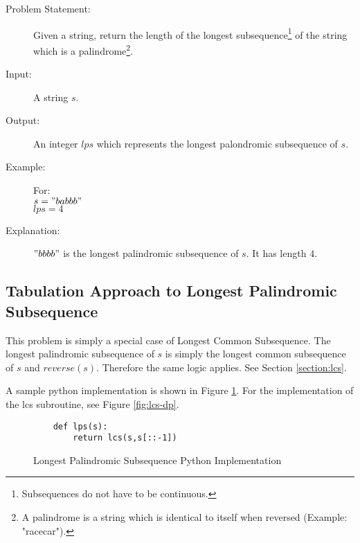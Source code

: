 \begin{description}
    \item[Problem Statement:]
        Given a string, return the length of the longest subsequence\footnote{Subsequences do not have to be continuous.} of the string which is a palindrome\footnote{A palindrome is a string which is identical to itself when reversed (Example: "racecar").}.
    
    \item[Input:]
        A string $s$.
        
    \item[Output:]
        An integer $lps$ which represents the longest palondromic subsequence of $s$.
        
    \item[Example:] For:\\
        $s = "babbb"$\\
        $lps = 4$
        
    \item[Explanation:]
        $"bbbb"$ is the longest palindromic subsequence of $s$. It has length $4$.
\end{description}

\subsection{Tabulation Approach to Longest Palindromic Subsequence}
This problem is simply a special case of Longest Common Subsequence.
The longest palindromic subsequence of $s$ is simply the longest common subsequence of $s$ and $reverse(s)$.
Therefore the same logic applies. See Section \ref{section:lcs}.

A sample python implementation is shown in Figure \ref{fig:lps-dp}.
For the implementation of the lcs subroutine, see Figure \ref{fig:lcs-dp}.

\begin{figure}[H]
    \centering
    \begin{lstlisting}
    def lps(s):
        return lcs(s,s[::-1])
    \end{lstlisting}
    \caption{Longest Palindromic Subsequence Python Implementation}
    \label{fig:lps-dp}
\end{figure}